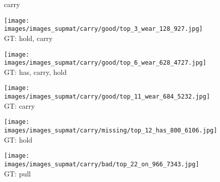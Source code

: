 \documentclass[10pt,twocolumn,letterpaper]{article}
\begin{document}
\begin{figure*}[t]
\begin{minipage}[t]{0.005\textwidth}
    	\centering
    	\vspace{-9ex}
    	\begin{turn}{90}
    	carry
    	\end{turn}
    	\vspace{2ex}
    \end{minipage}
    \hspace{0.01\textwidth}
\begin{minipage}[t]{0.18\textwidth}
    	\centering
       	\texttt{[image: images/images\_supmat/carry/good/top\_3\_wear\_128\_927.jpg]}\\
       	\vspace{0.3ex}
GT: hold, carry
       	\vspace{2ex}
    \end{minipage}
    \hspace{0.005\textwidth}
\begin{minipage}[t]{0.18\textwidth}
    	\centering
       	\texttt{[image: images/images\_supmat/carry/good/top\_6\_wear\_628\_4727.jpg]}\\
       	\vspace{0.3ex}
GT: has, carry, hold
       	\vspace{0.2ex}
    \end{minipage}
    \hspace{0.005\textwidth}
\begin{minipage}[t]{0.18\textwidth}
    	\centering
       	\texttt{[image: images/images\_supmat/carry/good/top\_11\_wear\_684\_5232.jpg]}\\
       	\vspace{0.3ex}
GT: carry
       	\vspace{0.2ex}
    \end{minipage}
    \hspace{0.005\textwidth}
\begin{minipage}[t]{0.18\textwidth}
    	\centering
       	\texttt{[image: images/images\_supmat/carry/missing/top\_12\_has\_800\_6106.jpg]}\\
       	\vspace{0.3ex}
GT: hold
       	\vspace{0.2ex}
   	\end{minipage}
    \hspace{0.005\textwidth}
\begin{minipage}[t]{0.18\textwidth}
    	\centering
       	\texttt{[image: images/images\_supmat/carry/bad/top\_22\_on\_966\_7343.jpg]}\\
       	\vspace{0.3ex}
GT: pull
       	\vspace{0.2ex}
    \end{minipage}   



\end{figure*}
\end{document}

